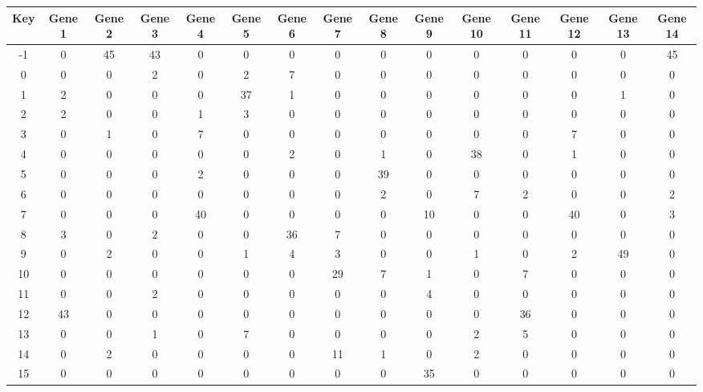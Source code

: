 \begin{tabular}{|c|c|c|c|c|c|c|c|c|c|c|c|c|c|c|}
\hline
Key & Gene 1 & Gene 2 & Gene 3 & Gene 4 & Gene 5 & Gene 6 & Gene 7 & Gene 8 & Gene 9 & Gene 10 & Gene 11 & Gene 12 & Gene 13 & Gene 14 \\
\hline
-1 & 0 & 45 & 43 & 0 & 0 & 0 & 0 & 0 & 0 & 0 & 0 & 0 & 0 & 45 \\
0 & 0 & 0 & 2 & 0 & 2 & 7 & 0 & 0 & 0 & 0 & 0 & 0 & 0 & 0 \\
1 & 2 & 0 & 0 & 0 & 37 & 1 & 0 & 0 & 0 & 0 & 0 & 0 & 1 & 0 \\
2 & 2 & 0 & 0 & 1 & 3 & 0 & 0 & 0 & 0 & 0 & 0 & 0 & 0 & 0 \\
3 & 0 & 1 & 0 & 7 & 0 & 0 & 0 & 0 & 0 & 0 & 0 & 7 & 0 & 0 \\
4 & 0 & 0 & 0 & 0 & 0 & 2 & 0 & 1 & 0 & 38 & 0 & 1 & 0 & 0 \\
5 & 0 & 0 & 0 & 2 & 0 & 0 & 0 & 39 & 0 & 0 & 0 & 0 & 0 & 0 \\
6 & 0 & 0 & 0 & 0 & 0 & 0 & 0 & 2 & 0 & 7 & 2 & 0 & 0 & 2 \\
7 & 0 & 0 & 0 & 40 & 0 & 0 & 0 & 0 & 10 & 0 & 0 & 40 & 0 & 3 \\
8 & 3 & 0 & 2 & 0 & 0 & 36 & 7 & 0 & 0 & 0 & 0 & 0 & 0 & 0 \\
9 & 0 & 2 & 0 & 0 & 1 & 4 & 3 & 0 & 0 & 1 & 0 & 2 & 49 & 0 \\
10 & 0 & 0 & 0 & 0 & 0 & 0 & 29 & 7 & 1 & 0 & 7 & 0 & 0 & 0 \\
11 & 0 & 0 & 2 & 0 & 0 & 0 & 0 & 0 & 4 & 0 & 0 & 0 & 0 & 0 \\
12 & 43 & 0 & 0 & 0 & 0 & 0 & 0 & 0 & 0 & 0 & 36 & 0 & 0 & 0 \\
13 & 0 & 0 & 1 & 0 & 7 & 0 & 0 & 0 & 0 & 2 & 5 & 0 & 0 & 0 \\
14 & 0 & 2 & 0 & 0 & 0 & 0 & 11 & 1 & 0 & 2 & 0 & 0 & 0 & 0 \\
15 & 0 & 0 & 0 & 0 & 0 & 0 & 0 & 0 & 35 & 0 & 0 & 0 & 0 & 0 \\
\hline
\end{tabular}